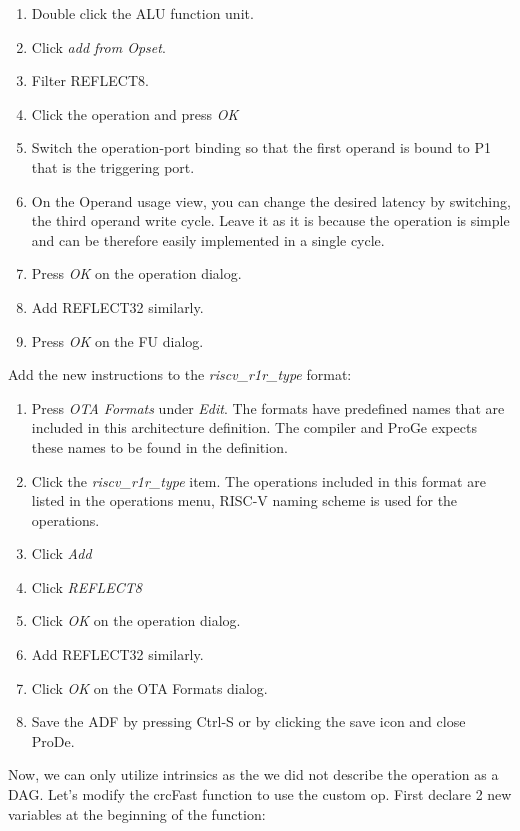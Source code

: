 \documentclass[a4paper,twoside]{tceusermanual}
\begin{document}

\begin{enumerate}
  \item%
    Double click the ALU function unit.
  \item%
    Click \emph{add from Opset}.
  \item%
    Filter REFLECT8.
  \item%
    Click the operation and press \emph{OK}
  \item%
    Switch the operation-port binding so that the first operand is bound to 
    P1 that is the triggering port.
  \item%
    On the Operand usage view, you can change the desired latency by switching,
    the third operand write cycle. Leave it as it is because the operation is 
    simple and can be therefore easily implemented in a single cycle.
  \item%
    Press \emph{OK} on the operation dialog.
  \item%
    Add REFLECT32 similarly.
  \item%
    Press \emph{OK} on the FU dialog.
\end{enumerate}

Add the new instructions to the \emph{riscv\_r1r\_type} format:

\begin{enumerate}
  \item%
    Press \emph{OTA Formats} under \emph{Edit}.
    The formats have predefined names that are included in this
    architecture definition. The compiler and ProGe expects these names to be 
    found in the definition. 
  \item%
    Click the \emph{riscv\_r1r\_type} item.
    The operations included in this format are listed in the operations menu,
    RISC-V naming scheme is used for the operations.
  \item%
    Click \emph{Add}
  \item%
    Click \emph{REFLECT8}
  \item%
    Click \emph{OK} on the operation dialog.
  \item%
    Add REFLECT32 similarly.
  \item%
    Click \emph{OK} on the OTA Formats dialog.
  \item%
    Save the ADF by pressing Ctrl-S or by clicking the save icon and close ProDe.
\end{enumerate}

Now, we can only utilize intrinsics as the we did not describe the operation as a DAG.
Let's modify the crcFast function to use the custom op. First declare 2 new
variables at the beginning of the function:
\end{document}
